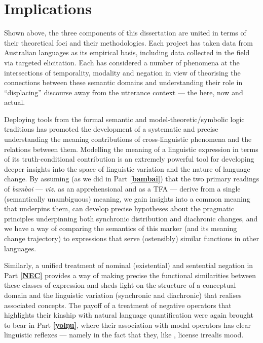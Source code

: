 \documentclass[11pt,dvipsnames]{report}
\begin{document}
\section{Implications}

Shown above, the three components of this dissertation are united in terms of their theoretical foci and their methodologies. Each project has taken data from Australian languages as its empirical basis, including data collected in the field via targeted elicitation. Each has considered a number of phenomena at the intersections of temporality, modality and negation in view of theorising the connections between these semantic domains and understanding their role in ``displacing'' discourse away from the utterance context --- the \textsf{here, now \textrm{and} actual}.


Deploying tools from the formal semantic and model-theoretic/symbolic logic traditions has promoted the development of a systematic and precise understanding the meaning contributions of cross-linguistic phenomena and the relations between them. Modelling the meaning of a linguistic expression in terms of its truth-conditional contribution is an extremely powerful tool for developing deeper insights into the space of linguistic variation and the nature of language change. By assuming (as we did in Part \textbf{\ref{bambai}}) that the two primary readings of \textit{bambai} --- \textit{viz.} as an apprehensional and as a \acrshort{TFA} --- derive from a single (semantically unambiguous) meaning, we gain insights into a common meaning that underpins them, can develop precise hypotheses about the pragmatic principles underpinning both synchronic distribution and diachronic changes, and we have a way of comparing the semantics of this marker (and its meaning change trajectory) to expressions that serve (ostensibly) similar functions in other languages.

Similarly, a unified treatment of nominal (existential) and sentential negation in Part \textbf{\ref{NEC}} provides a way of making precise the functional similarities between these classes of expression and sheds light on the structure of a conceptual domain and the linguistic variation (synchronic and diachronic) that realises associated concepts. The payoff of a treatment of negative operators that highlights their kinship with natural language quantification were again brought to bear in Part \textbf{\ref{yolŋu}}, where their association with modal operators has clear linguistic reflexes --- namely in the fact that they, like , license irrealis mood.
\end{document}
